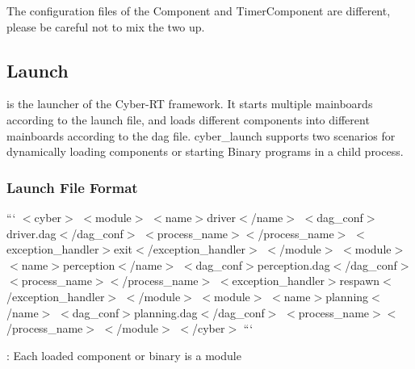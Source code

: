 {\ttfamily 
\begin{DoxyItemize}
\item The configuration files of the Component and Timer\-Component are different, please be careful not to mix the two up.
\end{DoxyItemize}}

{\ttfamily \subsection*{Launch}}

{\ttfamily }

{ is the launcher of the Cyber-\/\-R\-T framework. It starts multiple mainboards according to the launch file, and loads different components into different mainboards according to the dag file. cyber\-\_\-launch supports two scenarios for dynamically loading components or starting Binary programs in a child process.}

{\ttfamily \subsubsection*{Launch File Format}}

{\ttfamily }

{\ttfamily ``` $<$cyber$>$ $<$module$>$ $<$name$>$driver$<$/name$>$ $<$dag\-\_\-conf$>$driver.\-dag$<$/dag\-\_\-conf$>$ $<$process\-\_\-name$>$$<$/process\-\_\-name$>$ $<$exception\-\_\-handler$>$exit$<$/exception\-\_\-handler$>$ $<$/module$>$ $<$module$>$ $<$name$>$perception$<$/name$>$ $<$dag\-\_\-conf$>$perception.\-dag$<$/dag\-\_\-conf$>$ $<$process\-\_\-name$>$$<$/process\-\_\-name$>$ $<$exception\-\_\-handler$>$respawn$<$/exception\-\_\-handler$>$ $<$/module$>$ $<$module$>$ $<$name$>$planning$<$/name$>$ $<$dag\-\_\-conf$>$planning.\-dag$<$/dag\-\_\-conf$>$ $<$process\-\_\-name$>$$<$/process\-\_\-name$>$ $<$/module$>$ $<$/cyber$>$ ```}

{\-: Each loaded component or binary is a module}

